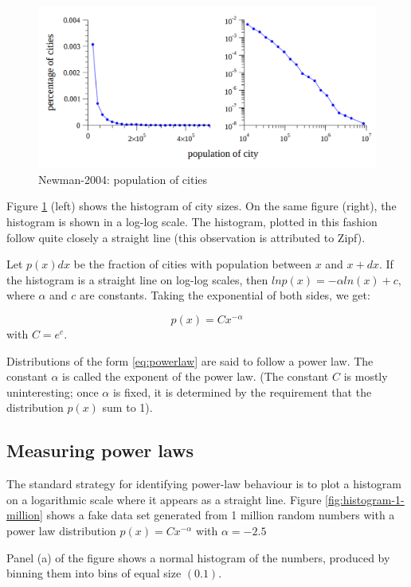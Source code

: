 \documentclass[a4paper, 12pt]{report}
\begin{document}
\begin{figure}[!htb]
\centering
\includegraphics[width=0.7\linewidth]{./population-of-cities}
\caption{Newman-2004: population of cities}
\label{fig:populations-of-cities}
\end{figure}

Figure \ref{fig:populations-of-cities} (left) shows the histogram of city sizes. On the same figure (right), the histogram is shown in a log-log scale. The histogram, plotted in this fashion follow quite closely a straight line (this observation is attributed to Zipf).

Let $p(x)dx$ be the fraction of cities with population between $x$ and $x+dx$. If the histogram is a straight line on log-log scales, then $ln p(x) = - \alpha ln(x) + c$, where $\alpha$ and $c$ are constants. Taking
the exponential of both sides, we get:

\begin{equation}
\label{eq:powerlaw}
p(x) = Cx^{- \alpha}
\end{equation}
with $C = e^c$.

Distributions of the form \ref{eq:powerlaw} are said to follow a power law. The constant $\alpha$ is called the exponent of the power law. (The constant $C$ is mostly uninteresting; once $\alpha$ is fixed, it is determined by the requirement that the distribution $p(x)$ sum to 1).

\newpage
\subsection{Measuring power laws}
The standard strategy for identifying power-law behaviour is to plot a histogram on a logarithmic scale where it appears as a straight line. Figure \ref{fig:histogram-1-million} shows a fake data set generated from 1 million random numbers with a power law distribution $p(x) = Cx^{- \alpha}$ with $\alpha=-2.5$

Panel (a) of the figure shows a normal histogram of the numbers, produced by binning them into bins of equal size $(0.1)$.
\end{document}
